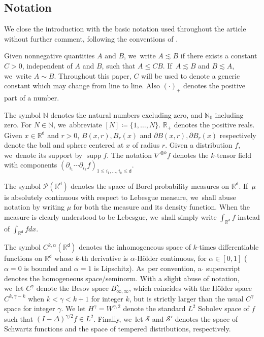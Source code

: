 \documentclass[10pt]{amsart}
\theoremstyle{plain}
\theoremstyle{definition}
\DeclareMathOperator{\supp}{supp}
\newcommand{\R}{{\mathbb{R}}}
\newcommand{\N}{{\mathbb{N}}}
\renewcommand{\P}{\mathcal{P}}
\newcommand{\Sc}{{\mathcal{S}}}
\let\al\alpha
\let\ga\gamma
\let\p\partial
\renewcommand{\d}{\mathsf{d}}
\begin{document}
\subsection{Notation}\label{ssec:preN}

We close the introduction with the basic notation used throughout the article without further comment, following the conventions of \cite{RS2022}.

Given nonnegative quantities $A$ and $B$, we~write $A\lesssim B$ if there exists a constant $C>0$, independent of $A$ and $B$, such that $A\leq CB$. If~$A \lesssim B$ and $B\lesssim A$, we~write $A\sim B$. Throughout this paper, $C$ will be used to denote a generic constant which may change from line to line. Also $(\cdot)_+$ denotes the positive part of a number.

The symbol $\N$ denotes the natural numbers excluding zero, and $\N_0$ including zero. {For $N\in\N$, we~abbreviate $[N]\coloneqq \{1,\ldots,N\}$.} $\R_+$ denotes the positive reals. Given $x\in\R^\d$ and $r>0$, $B(x,r), B_r(x)$ and $\p B(x,r), \p B_r(x)$ respectively denote the ball and sphere centered at $x$ of radius $r$. Given a distribution $f$, we~denote its support by $\supp f$. The notation $\nabla^{\otimes k}f$ denotes the $k$-tensor field with components $(\p_{i_1}\cdots\p_{i_k}f)_{1\leq i_1,\ldots,i_k\leq \d}$.

The symbol $\P(\R^\d)$ denotes the space of Borel probability measures on $\R^\d$. If~$\mu$ is absolutely continuous with respect to Lebesgue measure, we~shall abuse notation by writing $\mu$ for both the measure and its density function. When the measure is clearly understood to be Lebesgue, we~shall simply write $\int_{\R^{\d}}f$ instead of $\int_{\R^\d}fdx$.

The symbol $C^{k,\alpha}(\R^\d)$ denotes the inhomogeneous space of $k$-times differentiable functions on $\R^\d$ whose $k$-th derivative is $\alpha$-Hölder continuous, for $\al\in [0,1]$ (\ie $\alpha=0$ is bounded and $\alpha=1$ is Lipschitz). As~per convention, a $\dot{}$ superscript denotes the homogeneous space/seminorm. With a slight abuse of notation, we~let $C^{\ga}$ denote the Besov space $B_{\infty,\infty}^{\ga}$, which coincides with the Hölder space $C^{k,\ga-k}$ when $k<\ga<k+1$ for integer $k$, but is strictly larger than the usual $C^\ga$ space for integer $\ga$. We let $H^{\ga}=W^{\ga,2}$ denote the standard $L^2$ Sobolev space of $f$ such that $(I-\Delta)^{\ga/2}f\in L^2$. Finally, we~let $\Sc$ and $\Sc'$ denotes the space of Schwartz functions and the space of tempered distributions, respectively.
\end{document}
